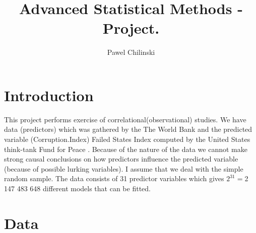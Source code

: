 \documentclass[a4paper]{article}
\title{Advanced Statistical Methods - Project.}
\author{Pawel Chilinski}
\begin{document}


\maketitle

\tableofcontents

\listoffigures

\listoftables

\section{Introduction}
This project performs exercise of correlational(observational) studies. We have
data (predictors) which was gathered by the The World Bank \cite{worldbankData} and the predicted
variable (Corruption.Index) Failed States Index computed by the United
States think-tank Fund for Peace \cite{WikiFailedStatesIndex}. Because of the
nature of the data we cannot make strong causal conclusions on how predictors
influence the predicted variable (because of possible lurking variables). I
assume that we deal with the simple random sample.
The data consists of 31 predictor variables which gives
$2^{31}=$2 147 483 648 different models that can be fitted.

\section{Data}
\end{document}
